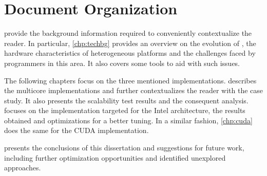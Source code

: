 \documentclass[../thesis]{subfiles}
\begin{document}
	\section{Document Organization}
	\label{sec:intro:organization}

	 provide the background information required to conveniently contextualize the reader. In particular, \cref{chp:techbg} provides an overview on the evolution of \hpc, the hardware characteristics of heterogeneous platforms and the challenges faced by programmers in this area. It also covers some tools to aid with such issues.

	The following chapters focus on the three mentioned implementations.  describes the multicore implementations and further contextualizes the reader with the case study. It also presents the scalability test results and the consequent analysis.  focuses on the implementation targeted	 for the Intel \mic architecture, the results obtained and optimizations for a better tuning. In a similar fashion, \cref{chp:cuda} does the same for the CUDA implementation.

	 presents the conclusions of this dissertation and suggestions for future work, including further optimization opportunities and identified unexplored approaches.
\end{document}

